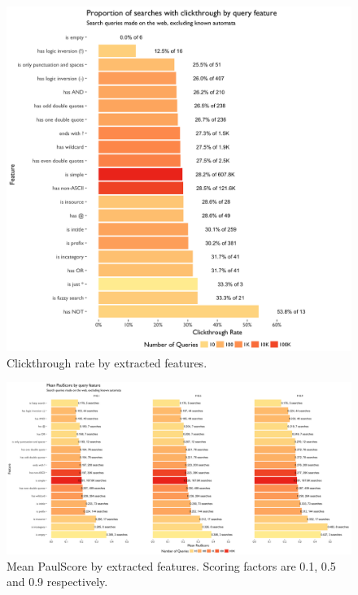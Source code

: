 \documentclass[12pt,]{article}
\begin{document}
\begin{figure}[htbp]
\centering
\includegraphics{figures/ctr_by_feature.png}
\caption{Clickthrough rate by extracted features.}
\end{figure}

\newpage

\begin{landscape}

\begin{figure}
\centering
\includegraphics{figures/paulscore_by_feature.png}
\caption{Mean PaulScore by extracted features. Scoring factors are 0.1, 0.5 and 0.9 respectively.}
\label{fig:paulscore_by_feature}
\end{figure}

\end{landscape}
\end{document}
